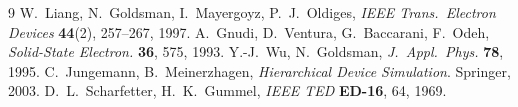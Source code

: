 \documentclass[11pt]{article}
\begin{document}
\begin{thebibliography}{9}\small
{} W.~Liang, N.~Goldsman, I.~Mayergoyz, P.~J.~Oldiges, \emph{IEEE Trans.\ Electron
Devices} \textbf{44}(2), 257--267, 1997.
 A.~Gnudi, D.~Ventura, G.~Baccarani, F.~Odeh, \emph{Solid-State Electron.}
\textbf{36}, 575, 1993.
 Y.-J.~Wu, N.~Goldsman, \emph{J.\ Appl.\ Phys.} \textbf{78}, 1995.
 C.~Jungemann, B.~Meinerzhagen, \emph{Hierarchical Device Simulation}.
Springer, 2003.
 D.~L.~Scharfetter, H.~K.~Gummel, \emph{IEEE TED} \textbf{ED-16}, 64, 1969.
\end{thebibliography}
\end{document}
